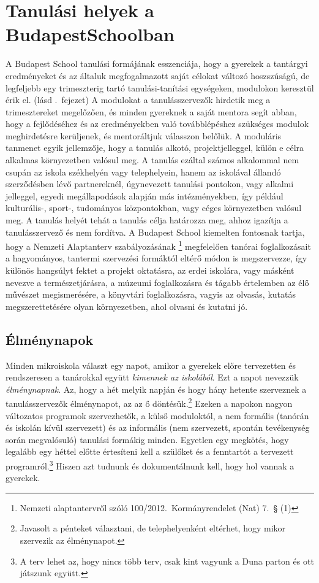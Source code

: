 \section[Tanulási helyek]{Tanulási helyek a Budapest\hfill\break Schoolban}

A Budapest School tanulási formájának esszenciája, hogy a gyerekek a tantárgyi eredményeket és az általuk megfogalmazott saját célokat változó hosz\-szúságú, de legfeljebb egy trimeszterig tartó tanulási-tanítási egységeken, modulokon keresztül érik el. (lásd .~fejezet) A modulokat a tanulásszervezők hirdetik meg a trimesztereket megelőzően, és minden gyereknek a saját mentora segít abban, hogy a fejlődéséhez és az eredményekben való továbblépéshez szükséges modulok meghirdetésre kerüljenek, és mentoráltjuk válasszon belőlük. A moduláris tanmenet egyik jellemzője, hogy a tanulás alkotó, projektjelleggel, külön e célra alkalmas környezetben valósul meg. A tanulás ezáltal számos alkalommal nem csupán az iskola székhelyén vagy telephelyein, hanem az iskolával állandó szerződésben lévő partnereknél, úgynevezett tanulási pontokon, vagy alkalmi jelleggel, egyedi megállapodások alapján más intézményekben, így például kulturális-, sport-, tudományos központokban, vagy céges környezetben valósul meg. A tanulás helyét tehát a tanulás célja határozza meg, ahhoz igazítja a tanulásszervező és nem fordítva.  A Budapest School kiemelten fontosnak tartja, hogy a Nemzeti Alaptanterv szabályozásának \footnote{Nemzeti alaptantervről szóló 100/2012.~Kormányrendelet (Nat) 7.~§  (1)} megfelelően tanórai foglalkozásait a hagyományos, tantermi szervezési formáktól eltérő módon is megszervezze, így különös hangsúlyt fektet a projekt oktatásra, az erdei iskolára, vagy másként nevezve a természetjárásra, a múzeumi foglalkozásra és tágabb értelemben az élő művészet megismerésére, a könyvtári foglalkozásra, vagyis az olvasás, kutatás megszerettetésére olyan környezetben, ahol olvasni és kutatni jó.

\subsection{Élménynapok}
Minden mikroiskola választ egy napot, amikor a gyerekek előre tervezetten és rendszeresen a tanárokkal együtt \emph{kimennek az iskolából}. Ezt a napot nevezzük \emph{élménynapnak}. Az, hogy a hét melyik napján és hogy hány hetente szerveznek a tanulásszervezők élménynapot, az az ő döntésük.\footnote{Javasolt a pénteket választani, de telephelyenként eltérhet, hogy mikor szervezik az élménynapot.}  Ezeken a napokon nagyon változatos programok szervezhetők, a külső moduloktól, a nem formális (tanórán és iskolán kívül szervezett) és az informális (nem szervezett, spontán tevékenység során megvalósuló) tanulási formákig minden. Egyetlen egy megkötés, hogy legalább egy héttel előtte értesíteni kell a szülőket és a fenntartót a tervezett programról.\footnote{A terv lehet az, hogy nincs több terv, csak kint vagyunk a Duna parton és ott játszunk együtt.} Hiszen azt tudnunk és dokumentálnunk kell, hogy hol vannak a gyerekek.

